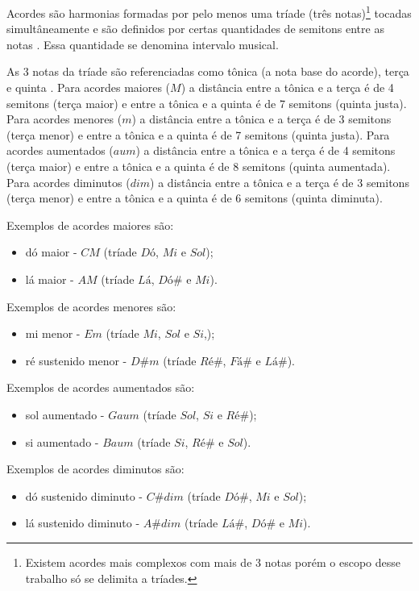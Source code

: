 Acordes são harmonias formadas por pelo menos uma tríade (três notas)\footnote{Existem acordes mais complexos com mais de 3 notas porém o escopo desse trabalho só se delimita a tríades.} tocadas simultâneamente e são definidos por certas quantidades de semitons entre as notas \cite{med1996teoria}. Essa quantidade se denomina intervalo musical.

As 3 notas da tríade são referenciadas como tônica (a nota base do acorde), terça e quinta \cite{med1996teoria}. Para acordes maiores ($M$) a distância entre a tônica e a terça é de 4 semitons (terça maior) e entre a tônica e a quinta é de 7 semitons (quinta justa). Para acordes menores ($m$) a distância entre a tônica e a terça é de 3 semitons (terça menor) e entre a tônica e a quinta é de 7 semitons (quinta justa). Para acordes aumentados ($aum$) a distância entre a tônica e a terça é de 4 semitons (terça maior) e entre a tônica e a quinta é de 8 semitons (quinta aumentada). Para acordes diminutos ($dim$) a distância entre a tônica e a terça é de 3 semitons (terça menor) e entre a tônica e a quinta é de 6 semitons (quinta diminuta).

Exemplos de acordes maiores são:
\begin{itemize}
	\item dó maior - $CM$ (tríade $Dó$, $Mi$ e $Sol$);
	\item lá maior - $AM$ (tríade $Lá$, $Dó\#$ e $Mi$).
\end{itemize}

Exemplos de acordes menores são:
\begin{itemize}
	\item mi menor - $Em$ (tríade  $Mi$, $Sol$ e $Si$,);
	\item ré sustenido menor - $D\#m$ (tríade $Ré\#$, $Fá\#$ e $Lá\#$).
\end{itemize}

Exemplos de acordes aumentados são:
\begin{itemize}
	\item sol aumentado - $Gaum$ (tríade  $Sol$, $Si$ e $Ré\#$);
	\item si aumentado - $Baum$ (tríade $Si$, $Ré\#$ e $Sol$).
\end{itemize}

Exemplos de acordes diminutos são:
\begin{itemize}
	\item dó sustenido diminuto - $C\#dim$ (tríade $Dó\#$, $Mi$ e $Sol$);
	\item lá sustenido diminuto - $A\#dim$ (tríade $Lá\#$, $Dó\#$ e $Mi$).
\end{itemize}

